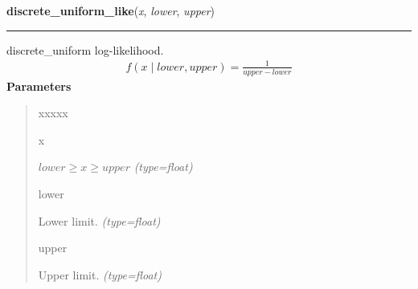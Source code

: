 \hspace{.8\funcindent}\begin{boxedminipage}{\funcwidth}

    \raggedright \textbf{discrete\_uniform\_like}(\textit{x}, \textit{lower}, \textit{upper})

    \vspace{-1.5ex}

    \rule{\textwidth}{1pt}
\setlength{\parskip}{2ex}

discrete{\_}uniform log-likelihood.
\begin{equation*}\begin{split}f(x \mid lower, upper) = \frac{1}{upper-lower}\end{split}\end{equation*}\setlength{\parskip}{1ex}
      \textbf{Parameters}
      \vspace{-1ex}

      \begin{quote}
        \begin{Ventry}{xxxxx}

          \item[x]


$lower \geq x \geq upper$
            {\it (type=float)}

          \item[lower]


Lower limit.
            {\it (type=float)}

          \item[upper]


Upper limit.
            {\it (type=float)}

        \end{Ventry}

      \end{quote}

    \end{boxedminipage}

    \label{pymc:distributions:exponential_like}

    \vspace{0.5ex}

